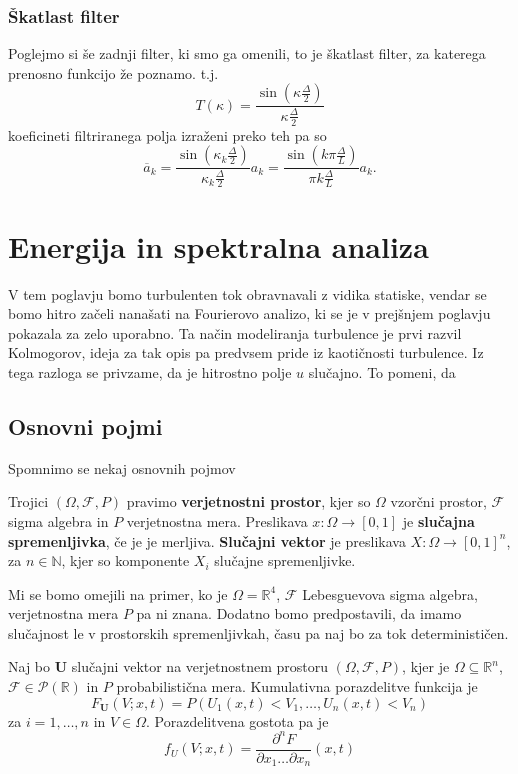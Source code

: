 \documentclass[mat2, tisk]{fmfdelo}
\newcommand{\R}{\mathbb R}
\newcommand{\N}{\mathbb N}
\newcommand{\bd}{\textbf}
\begin{document}
\subsubsection{Škatlast filter}
Poglejmo si še zadnji filter, ki smo ga omenili, to je 
škatlast filter, za katerega prenosno funkcijo že poznamo. t.j.
$$
T(\kappa) = \frac{\sin(\kappa \frac{\Delta}{2})}{\kappa \frac{\Delta}{2}}
$$
koeficineti filtriranega polja izraženi preko teh pa so 
$$
\overline{a}_k = \frac{\sin(\kappa_k \frac{\Delta}{2})}{\kappa_k \frac{\Delta}{2}} a_k = \frac{\sin(k\pi\frac{\Delta}{L})}{\pi k\frac{\Delta}{L}} a_k .
$$


\section{Energija in spektralna analiza}

V tem poglavju bomo turbulenten tok obravnavali z vidika statiske, 
vendar se bomo hitro začeli nanašati na Fourierovo analizo, ki 
se je v prejšnjem poglavju pokazala za zelo uporabno. Ta način 
modeliranja turbulence je prvi razvil Kolmogorov, ideja za tak 
opis pa predvsem pride iz kaotičnosti turbulence. Iz tega razloga se 
privzame, da je hitrostno polje $u$ slučajno. To pomeni, da 

\subsection{Osnovni pojmi}

Spomnimo se nekaj osnovnih pojmov

\begin{definicija}
Trojici $(\Omega, \mathcal{F}, P)$ pravimo \textbf{verjetnostni prostor}, 
kjer so $\Omega$ vzorčni prostor, $\mathcal{F}$ sigma algebra in 
$P$ verjetnostna mera. Preslikava $x: \Omega \rightarrow [0, 1]$ 
je \textbf{slučajna spremenljivka}, če je je merljiva. 
\textbf{Slučajni vektor} je preslikava $X: \Omega \rightarrow [0, 1]^n$, 
za $n\in \N$, kjer so komponente $X_i$ slučajne spremenljivke.
\end{definicija}

Mi se bomo omejili na primer, ko je $\Omega = \R^4$, $\mathcal{F}$ 
Lebesguevova sigma algebra, verjetnostna mera $P$ pa ni znana. 
Dodatno bomo predpostavili, da imamo slučajnost le v prostorskih 
spremenljivkah, času pa naj bo za tok determinističen. 

\begin{definicija}
Naj bo $\bd{U}$ slučajni vektor na verjetnostnem prostoru $(\Omega, \mathcal{F}, P)$,
kjer je $\Omega \subseteq \R^n$, $\mathcal{F} \in \mathcal{P}(\R)$ in $P$ probabilistična mera.
Kumulativna porazdelitve funkcija je
\begin{equation}
F_\bd{U}(V; x, t) = P(U_1(x, t) < V_1, \dots, U_n(x, t) < V_n)
\end{equation}
za $i = 1, \dots, n$ in $V \in \Omega$. Porazdelitvena 
gostota pa je 
\begin{equation}
f_U(V; x, t) = \frac{\partial^n F}{\partial x_1 \dots \partial x_n}(x, t)
\end{equation}
\end{definicija}
\end{document}
